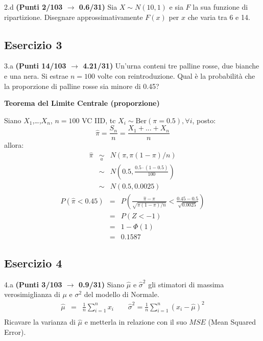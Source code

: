 \documentclass[
  11pt,
]{book}
\theoremstyle{mytheoremstyle}
\theoremstyle{mydefstyle}
\newenvironment{sol}
  {
  \begin{tcolorbox}[enhanced,breakable,arc=0.1mm,boxrule=1pt,colback=white,colframe=iblue,
  title=\bf \fontfamily{lmss}\selectfont \hspace{.5 cm} Soluzione,drop fuzzy shadow]

}{
\end{tcolorbox}
  }
\begin{document}
2.d \textbf{(Punti 2/103 \(\rightarrow\) 0.6/31)} Sia \(X\sim N(10,1)\) e sia \(F\) la sua funzione di ripartizione. Disegnare approssimativamente \(F(x)\) per \(x\) che varia tra 6 e 14.

\subsection{Esercizio 3}\label{esercizio-3-24}

3.a \textbf{(Punti 14/103 \(\rightarrow\) 4.21/31)} Un'urna conteni tre palline rosse, due bianche e una nera. Si estrae \(n=100\) volte con reintroduzione. Qual è la probabilità che la proporzione di palline rosse sia minore di 0.45?

\begin{sol}
\textbf{Teorema del Limite Centrale (proporzione)}

Siano \(X_1\),\ldots,\(X_n\), \(n=100\) VC IID, tc \(X_i\sim\text{Ber}(\pi=0.5)\)\(,\forall i\), posto:
\[
      \hat\pi=\frac{S_n}n = \frac{X_1 + ... + X_n}n
      \]
allora:\begin{eqnarray*}
  \hat\pi & \mathop{\sim}\limits_{a}& N(\pi,\pi(1-\pi)/n) \\
  &\sim & N\left(0.5,\frac{0.5\cdot(1-0.5)}{100}\right) \\
     &\sim & N(0.5,0.0025) 
  \end{eqnarray*}\begin{eqnarray*}
      P( \hat\pi   <   0.45 ) 
        &=& P\left(  \frac { \hat\pi  -  \pi }{ \sqrt{\pi(1-\pi)/n} }  <  \frac { 0.45  -  0.5 }{\sqrt{ 0.0025 }} \right)  \\
                 &=& P\left(  Z   <   -1 \right) \\    
                 &=&  1-\Phi( 1 ) \\ &=&  0.1587 
      \end{eqnarray*}

\end{sol}

\subsection{Esercizio 4}\label{esercizio-4-24}

4.a \textbf{(Punti 3/103 \(\rightarrow\) 0.9/31)} Siano \(\hat \mu\) e \(\hat\sigma^2\) gli stimatori di massima verosimiglianza di \(\mu\) e \(\sigma^2\) del modello di Normale.
\begin{eqnarray*}
  \hat\mu &=&  \frac 1n\sum_{i=1}^nx_i \qquad \hat\sigma^2 =  \frac 1n\sum_{i=1}^n(x_i-\hat\mu)^2\\
\end{eqnarray*}
Ricavare la varianza di \(\hat\mu\) e metterla in relazione con il suo \(MSE\) (Mean Squared Error).
\end{document}
